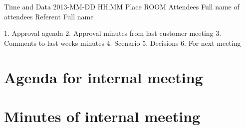 Time and Data 	2013-MM-DD HH:MM
Place			ROOM
Attendees  		Full name of attendees
Referent  		Full name

1. Approval agenda
2. Approval minutes from last customer meeting
3. Comments to last weeks minutes
4. Scenario
5. Decisions
6. For next meeting

\section{Agenda for internal meeting}

\section{Minutes of internal meeting}